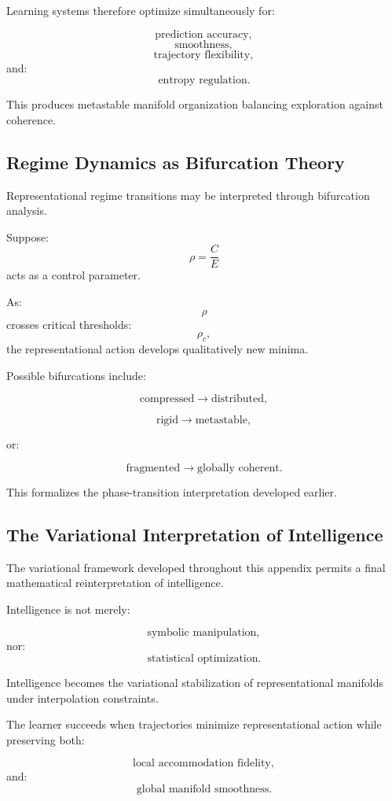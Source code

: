 \documentclass[12pt,a4paper]{article}
\begin{document}
Learning systems therefore optimize simultaneously for:

\[
\text{prediction accuracy},
\]
\[
\text{smoothness},
\]
\[
\text{trajectory flexibility},
\]
and:
\[
\text{entropy regulation}.
\]

This produces metastable manifold organization balancing exploration against coherence.

\subsection{Regime Dynamics as Bifurcation Theory}

Representational regime transitions may be interpreted through bifurcation analysis.

Suppose:
\[
\rho
=
\frac{C}{E}
\]
acts as a control parameter.

As:
\[
\rho
\]
crosses critical thresholds:
\[
\rho_c,
\]
the representational action develops qualitatively new minima.

Possible bifurcations include:

\[
\text{compressed}
\rightarrow
\text{distributed},
\]

\[
\text{rigid}
\rightarrow
\text{metastable},
\]

or:

\[
\text{fragmented}
\rightarrow
\text{globally coherent}.
\]

This formalizes the phase-transition interpretation developed earlier.

\subsection{The Variational Interpretation of Intelligence}

The variational framework developed throughout this appendix permits a final mathematical reinterpretation of intelligence.

Intelligence is not merely:

\[
\text{symbolic manipulation},
\]
nor:
\[
\text{statistical optimization}.
\]

Intelligence becomes the variational stabilization of representational manifolds under interpolation constraints.

The learner succeeds when trajectories minimize representational action while preserving both:

\[
\text{local accommodation fidelity},
\]
and:
\[
\text{global manifold smoothness}.
\]
\end{document}
